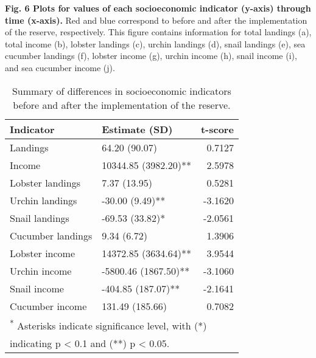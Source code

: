 \documentclass[12pt,]{article}
\begin{document}
\textbf{Fig. 6 Plots for values of each socioeconomic indicator (y-axis)
through time (x-axis).} Red and blue correspond to before and after the
implementation of the reserve, respectively. This figure contains
information for total landings (a), total income (b), lobster landings
(c), urchin landings (d), snail landings (e), sea cucumber landings (f),
lobster income (g), urchin income (h), snail income (i), and sea
cucumber income (j).

\begin{table}

\caption{\label{tab:table of soc results}Summary of differences in socioeconomic indicators before and after the implementation of the reserve.}
\centering
\begin{tabular}[t]{l|l|r}
\hline
Indicator & Estimate (SD) & t-score\\
\hline
Landings & 64.20 (90.07) & 0.7127\\
\hline
Income & 10344.85 (3982.20)** & 2.5978\\
\hline
Lobster landings & 7.37 (13.95) & 0.5281\\
\hline
Urchin landings & -30.00 (9.49)** & -3.1620\\
\hline
Snail landings & -69.53 (33.82)* & -2.0561\\
\hline
Cucumber landings & 9.34 (6.72) & 1.3906\\
\hline
Lobster income & 14372.85 (3634.64)** & 3.9544\\
\hline
Urchin income & -5800.46 (1867.50)** & -3.1060\\
\hline
Snail income & -404.85 (187.07)** & -2.1641\\
\hline
Cucumber income & 131.49 (185.66) & 0.7082\\
\hline
\multicolumn{3}{l}{\textsuperscript{*} Asterisks indicate significance level, with (*)}\\
\multicolumn{3}{l}{indicating p < 0.1 and (**) p < 0.05.}\\
\end{tabular}
\end{table}
\end{document}
